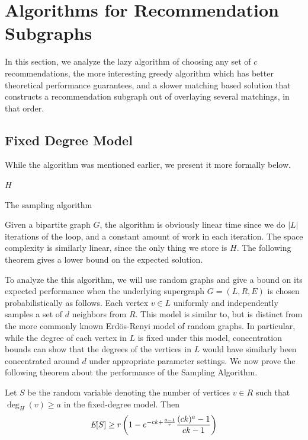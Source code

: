\section{Algorithms for Recommendation Subgraphs}
In this section, we analyze the lazy algorithm of choosing any set of
$c$ recommendations, the more interesting greedy algorithm which has
better theoretical performance guarantees, and a slower matching based
solution that constructs a recommendation subgraph out of overlaying
several matchings, in that order.

\subsection{Fixed Degree Model}
\label{fixed-degree}

While the algorithm was mentioned earlier, we present it more formally 
below.

\begin{algorithm}[h]
  \SetAlgoLined
  \Return $H$\;
  \caption{The sampling algorithm}
\end{algorithm}\vs

Given a bipartite graph $G$, the algorithm is obviously linear time
since we do $|L|$ iterations of the loop, and a constant amount of
work in each iteration. The space complexity is similarly linear,
since the only thing we store is $H$. The following theorem gives a
lower bound on the expected solution.

To analyze the this algorithm, we will use random graphs and give a
bound on its expected performance when the underlying supergraph $G=(L,R,E)$
is chosen probabilistically as follows. Each vertex $v\in L$
uniformly and independently samples a set of $d$ neighbors from $R$.
This model is similar to, but is distinct from the more commonly 
known Erd\"{o}s-Renyi model of random graphs. In particular, while the
degree of each vertex in $L$ is fixed under this model, concentration
bounds can show that the degrees of the vertices in $L$ would have
similarly been concentrated around $d$ under appropriate parameter
settings. We now prove the following theorem about the performance
of the Sampling Algorithm.

\begin{thm}\label{original_result}
Let $S$ be the
random variable denoting the number of vertices $v \in R$ such that
$\deg_{H}(v)\geq a$ in the fixed-degree model. Then
\[ \emph{\text{E}}[S] \geq r\left(1-e^{-ck+\frac{a-1}{r}}\frac{(ck)^a-1}{ck-1}\right)  \]
\end{thm}

